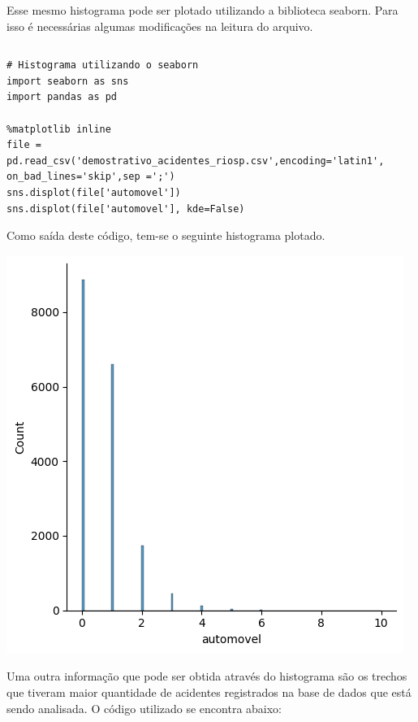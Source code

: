\documentclass[a4paper, 12pt]{article}
\begin{document}
Esse mesmo histograma pode ser plotado utilizando a biblioteca seaborn. Para isso é necessárias algumas modificações na leitura do arquivo.


\begin{tabular}{ccc}
\end{tabular}

\begin{lstlisting} 
# Histograma utilizando o seaborn
import seaborn as sns
import pandas as pd

%matplotlib inline
file = pd.read_csv('demostrativo_acidentes_riosp.csv',encoding='latin1', on_bad_lines='skip',sep =';')
sns.displot(file['automovel'])
sns.displot(file['automovel'], kde=False)

\end{lstlisting}

Como saída deste código, tem-se o seguinte histograma plotado.

\includegraphics[scale=0.7]{output02.png}

Uma outra informação que pode ser obtida através do histograma são os trechos que tiveram maior quantidade de acidentes registrados na base de dados que está sendo analisada. O código utilizado se encontra abaixo:


\begin{tabular}{ccc}
\end{tabular}
\end{document}
